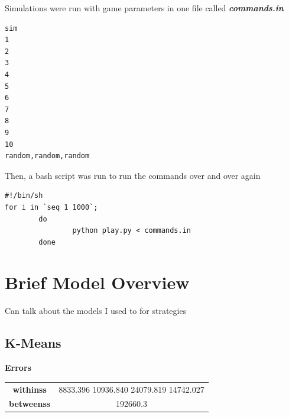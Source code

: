 \documentclass[11pt, oneside]{article}   	%
\begin{document}
Simulations were run with game parameters in one file called \textbf{\textit{commands.in}}

\begin{verbatim}
sim
1
2
3
4
5
6
7
8
9
10
random,random,random
\end{verbatim}

Then, a bash script was run to run the commands over and over again

\begin{verbatim}
#!/bin/sh
for i in `seq 1 1000`;
        do
                python play.py < commands.in
        done
\end{verbatim}


\section{Brief Model Overview}

Can talk about the models I used to for strategies

\subsection{K-Means}

\textbf{Errors}\\

\begin{center}
\begin{tabular}{||c | c ||}
\hline
 \textbf{withinss} & 8833.396 10936.840 24079.819 14742.027 \\ 
 \textbf{betweenss} & 192660.3 \\  
 \hline
\end{tabular}
\end{center}
\end{document}
